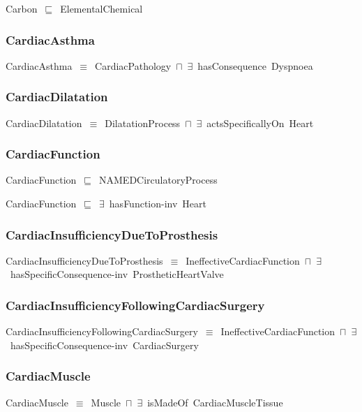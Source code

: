 \documentclass{article}
\begin{document}
Carbon~\ensuremath{\sqsubseteq}~ElementalChemical~

\subsubsection*{CardiacAsthma}

CardiacAsthma~\ensuremath{\equiv}~CardiacPathology~\ensuremath{\sqcap}~\ensuremath{\exists}~hasConsequence~Dyspnoea

\subsubsection*{CardiacDilatation}

CardiacDilatation~\ensuremath{\equiv}~DilatationProcess~\ensuremath{\sqcap}~\ensuremath{\exists}~actsSpecificallyOn~Heart

\subsubsection*{CardiacFunction}

CardiacFunction~\ensuremath{\sqsubseteq}~NAMEDCirculatoryProcess~

CardiacFunction~\ensuremath{\sqsubseteq}~\ensuremath{\exists}~hasFunction-inv~Heart~

\subsubsection*{CardiacInsufficiencyDueToProsthesis}

CardiacInsufficiencyDueToProsthesis~\ensuremath{\equiv}~IneffectiveCardiacFunction~\ensuremath{\sqcap}~\ensuremath{\exists}~hasSpecificConsequence-inv~ProstheticHeartValve

\subsubsection*{CardiacInsufficiencyFollowingCardiacSurgery}

CardiacInsufficiencyFollowingCardiacSurgery~\ensuremath{\equiv}~IneffectiveCardiacFunction~\ensuremath{\sqcap}~\ensuremath{\exists}~hasSpecificConsequence-inv~CardiacSurgery

\subsubsection*{CardiacMuscle}

CardiacMuscle~\ensuremath{\equiv}~Muscle~\ensuremath{\sqcap}~\ensuremath{\exists}~isMadeOf~CardiacMuscleTissue
\end{document}
